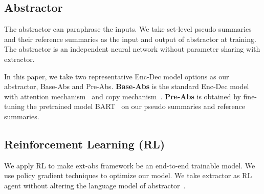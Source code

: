 \subsection{Abstractor}
The abstractor can paraphrase the inputs.
We take set-level pseudo summaries and their reference summaries 
as the input and output of abstractor at training.
The abstractor is an independent neural network without parameter sharing with extractor.

In this paper, we take two representative Enc-Dec model options as our abstractor,
Base-Abs and Pre-Abs. \textbf{Base-Abs} is the standard Enc-Dec model with attention mechanism~\cite{luong15}
and copy mechanism~\cite{SeeLM17}.
\textbf{Pre-Abs} is obtained by fine-tuning the pretrained model BART~\cite{BART19} 
on our pseudo summaries and reference summaries.

\subsection{Reinforcement Learning (RL)}
We apply RL to make ext-abs framework be an end-to-end trainable model.
We use policy gradient techniques
to optimize our model.
We take extractor as RL agent without altering the language model of abstractor~\cite{FastAbs18}.

